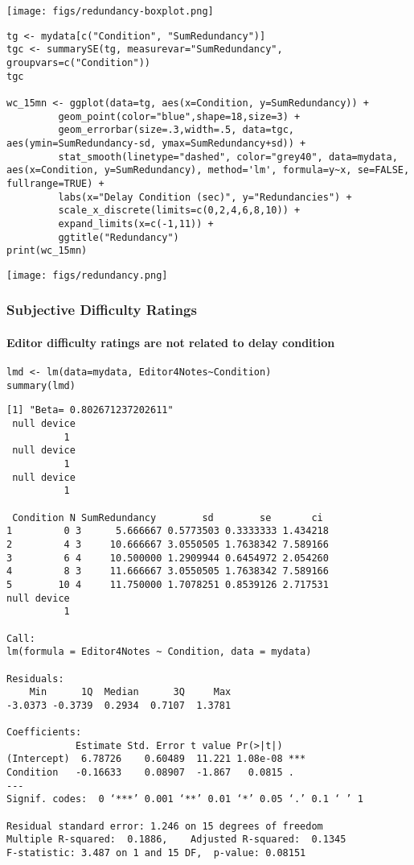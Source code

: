 \documentclass[10pt]{article}
\begin{document}
\texttt{[image: figs/redundancy-boxplot.png]}


\begin{verbatim}
tg <- mydata[c("Condition", "SumRedundancy")]
tgc <- summarySE(tg, measurevar="SumRedundancy", groupvars=c("Condition"))
tgc

wc_15mn <- ggplot(data=tg, aes(x=Condition, y=SumRedundancy)) +
	     geom_point(color="blue",shape=18,size=3) +
	     geom_errorbar(size=.3,width=.5, data=tgc, aes(ymin=SumRedundancy-sd, ymax=SumRedundancy+sd)) +
	     stat_smooth(linetype="dashed", color="grey40", data=mydata, aes(x=Condition, y=SumRedundancy), method='lm', formula=y~x, se=FALSE, fullrange=TRUE) +
	     labs(x="Delay Condition (sec)", y="Redundancies") +
	     scale_x_discrete(limits=c(0,2,4,6,8,10)) +
	     expand_limits(x=c(-1,11)) +
	     ggtitle("Redundancy")
print(wc_15mn)
\end{verbatim}

\texttt{[image: figs/redundancy.png]}



\subsubsection{Subjective Difficulty Ratings}
\label{sec-2-2-3}

\paragraph*{Editor difficulty ratings are not related to delay condition}
\label{sec-2-2-3-1}

\begin{verbatim}
lmd <- lm(data=mydata, Editor4Notes~Condition)
summary(lmd)
\end{verbatim}

\begin{verbatim}
[1] "Beta= 0.802671237202611"
 null device 
          1
 null device 
          1
 null device 
          1
 
 Condition N SumRedundancy        sd        se       ci
1         0 3      5.666667 0.5773503 0.3333333 1.434218
2         4 3     10.666667 3.0550505 1.7638342 7.589166
3         6 4     10.500000 1.2909944 0.6454972 2.054260
4         8 3     11.666667 3.0550505 1.7638342 7.589166
5        10 4     11.750000 1.7078251 0.8539126 2.717531
null device 
          1

Call:
lm(formula = Editor4Notes ~ Condition, data = mydata)

Residuals:
    Min      1Q  Median      3Q     Max 
-3.0373 -0.3739  0.2934  0.7107  1.3781 

Coefficients:
            Estimate Std. Error t value Pr(>|t|)    
(Intercept)  6.78726    0.60489  11.221 1.08e-08 ***
Condition   -0.16633    0.08907  -1.867   0.0815 .  
---
Signif. codes:  0 ‘***’ 0.001 ‘**’ 0.01 ‘*’ 0.05 ‘.’ 0.1 ‘ ’ 1

Residual standard error: 1.246 on 15 degrees of freedom
Multiple R-squared:  0.1886,	Adjusted R-squared:  0.1345 
F-statistic: 3.487 on 1 and 15 DF,  p-value: 0.08151
\end{verbatim}
\end{document}
